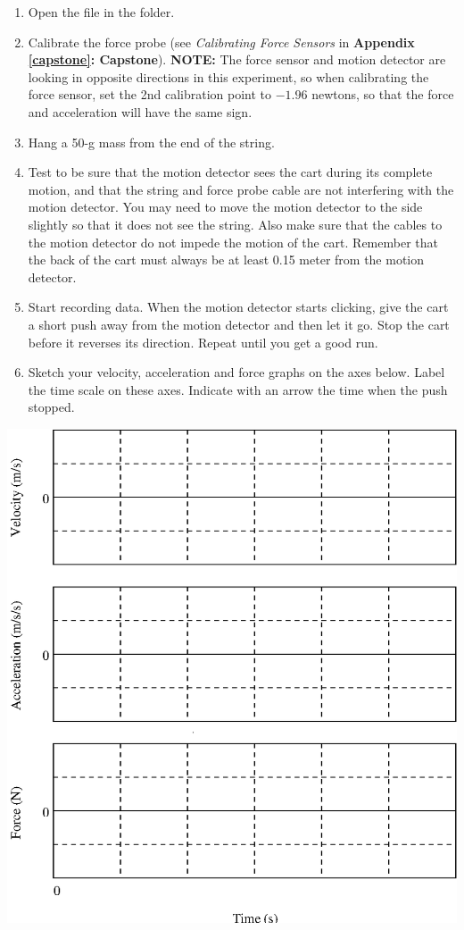 \begin{enumerate}
\item Open the file  in the \filename{\coursefolder} folder.

\item Calibrate the force probe (see \textit{Calibrating Force Sensors} in \textbf{Appendix \ref{capstone}: Capstone}).
\textbf{NOTE:} The force sensor and motion detector are looking in opposite directions in 
this experiment, so when calibrating the force sensor, set the 2nd calibration point to $-1.96$ 
newtons, so that the force and acceleration will have the same sign.
\item Hang a 50-g mass from the end of the string.
\item Test to be sure that the motion detector sees the cart during its complete motion,
and that the string and force probe cable are not interfering with the motion
detector. You may need to move the motion detector to the side slightly so that
it does not see the string. Also make sure that the cables to the motion detector
do not impede the motion of the cart. Remember that the back of the cart must
always be at least 0.15 meter from the motion detector. 
\item Start recording data. When the motion detector starts clicking, give the cart
a short push away from the motion detector and then let it go. Stop the cart
before it reverses its direction. Repeat until you get a good run. 
\item Sketch your velocity, acceleration and force graphs on the axes below. Label
the time scale on these axes. Indicate with an arrow the time when the push
stopped.
\end{enumerate}
\vspace{0.3cm}
{\par\centering \includegraphics{force2/force2_fig4.eps} \par}
\vspace{0.3cm}

